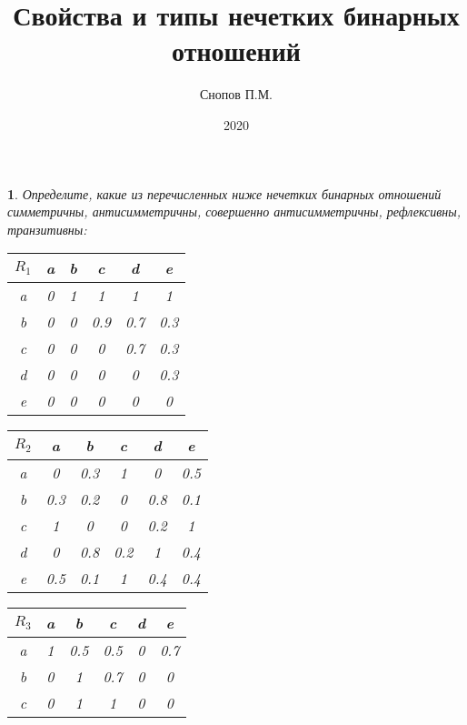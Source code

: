 \documentclass[11pt,a4paper,oneside]{article}
\title{Свойства и типы нечетких бинарных отношений}
\date{2020}
\author{Снопов П.М.}
\newenvironment{problem}{
	\medskip
	\begin{problem-internal}
	}{
	\end{problem-internal}
}
\newtheorem{problem-internal}{}
\newcommand{\+}{$\boldsymbol{+}$}
\begin{document}
	\maketitle
	
	
	
	
	\begin{problem}
		Определите, какие из перечисленных ниже нечетких бинарных отношений симметричны,
		антисимметричны, совершенно антисимметричны, рефлексивны, транзитивны:
		\begin{table}[!htbp]
			\centering
			\begin{tabular}{|c|c|c|c|c|c|}
				\hline
				$R_1$ & a & b & c   & d   & e   \\ \hline
				a     & 0 & 1 & 1   & 1   & 1   \\ \hline
				b     & 0 & 0 & 0.9 & 0.7 & 0.3 \\ \hline
				c     & 0 & 0 & 0   & 0.7 & 0.3 \\ \hline
				d     & 0 & 0 & 0   & 0   & 0.3 \\ \hline
				e     & 0 & 0 & 0   & 0   & 0   \\ \hline
			\end{tabular}
			\quad
			\centering
			\begin{tabular}{|c|c|c|c|c|c|}
				\hline
				$R_2$ & a   & b   & c   & d   & e   \\ \hline
				a     & 0   & 0.3 & 1   & 0   & 0.5 \\ \hline
				b     & 0.3 & 0.2 & 0   & 0.8 & 0.1 \\ \hline
				c     & 1   & 0   & 0   & 0.2 & 1   \\ \hline
				d     & 0   & 0.8 & 0.2 & 1   & 0.4 \\ \hline
				e     & 0.5 & 0.1 & 1   & 0.4 & 0.4 \\ \hline
			\end{tabular}
		\end{table}
		\begin{table}[!htbp]
			\centering
			\begin{tabular}{|c|c|c|c|c|c|}
				\hline
				$R_3$ & a & b   & c   & d & e   \\ \hline
				a     & 1 & 0.5 & 0.5 & 0 & 0.7 \\ \hline
				b     & 0 & 1   & 0.7 & 0 & 0   \\ \hline
				c     & 0 & 1   & 1   & 0 & 0   \\ \hline

\end{tabular}
\end{table}
\end{problem}
\end{document}
